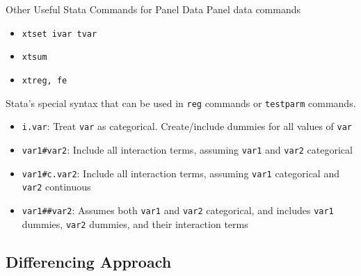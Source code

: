 \documentclass[aspectratio=169, handout]{beamer}
\begin{document}
{\footnotesize
\begin{frame}{Other Useful Stata Commands for Panel Data}
Panel data commands
\begin{itemize}
  \item \texttt{xtset ivar tvar}
  \item \texttt{xtsum}
  \item \texttt{xtreg, fe}
\end{itemize}
Stata's special syntax that can be used in \texttt{reg} commands or
\texttt{testparm} commands.
\begin{itemize}
  \item \alert{\texttt{i.var}}:
    Treat \texttt{var} as categorical.
    Create/include dummies for all values of \texttt{var}
  \item \alert{\texttt{var1\#var2}}:
    Include all interaction terms,
    assuming {\texttt{var1}} and {\texttt{var2}} categorical
  \item \alert{\texttt{var1\#c.var2}}:
    Include all interaction terms, assuming \texttt{var1} categorical
    and \texttt{var2} continuous
  \item \alert{\texttt{var1\#\#var2}}:
    Assumes both \texttt{var1} and \texttt{var2} categorical,
    and includes \texttt{var1} dummies, \texttt{var2} dummies, and their
    interaction terms
\end{itemize}
\end{frame}
}


\subsection{Differencing Approach}
\end{document}
